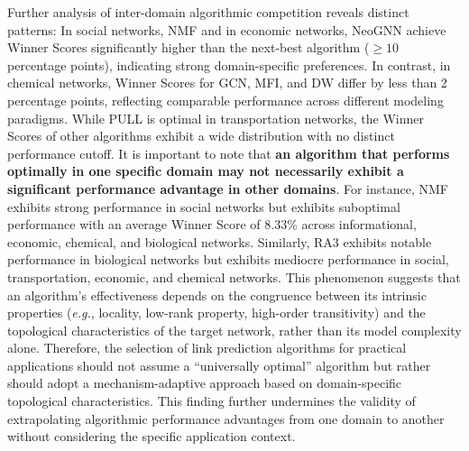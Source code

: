 \documentclass{article}
\begin{document}
Further analysis of inter-domain algorithmic competition reveals distinct patterns: In social networks, NMF and in economic networks, NeoGNN achieve Winner Scores significantly higher than the next-best algorithm ($\geq 10$ percentage points), indicating strong domain-specific preferences. In contrast, in chemical networks, Winner Scores for GCN, MFI, and DW differ by less than 2 percentage points, reflecting comparable performance across different modeling paradigms. While PULL is optimal in transportation networks, the Winner Scores of other algorithms exhibit a wide distribution with no distinct performance cutoff. It is important to note that \textbf{an algorithm that performs optimally in one specific domain may not necessarily exhibit a significant performance advantage in other domains}. For instance, NMF exhibits strong performance in social networks but exhibits suboptimal performance with an average Winner Score of 8.33\% across informational, economic, chemical, and biological networks. Similarly, RA3 exhibits notable performance in biological networks but exhibits mediocre performance in social, transportation, economic, and chemical networks. This phenomenon suggests that an algorithm's effectiveness depends on the congruence between its intrinsic properties (\textit{e.g.}, locality, low-rank property, high-order transitivity) and the topological characteristics of the target network, rather than its model complexity alone. Therefore, the selection of link prediction algorithms for practical applications should not assume a ``universally optimal'' algorithm but rather should adopt a mechanism-adaptive approach based on domain-specific topological characteristics. This finding further undermines the validity of extrapolating algorithmic performance advantages from one domain to another without considering the specific application context.
	
	
\end{document}
